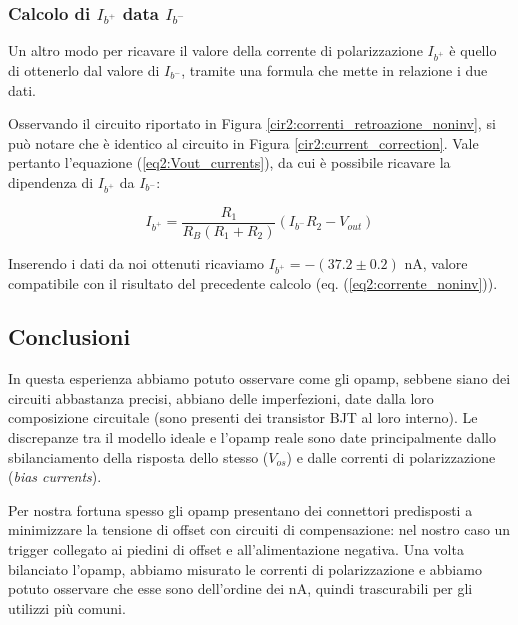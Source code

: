 \subsubsection*{Calcolo di $I_{b^+}$ data $I_{b^-}$}

Un altro modo per ricavare il valore della corrente di polarizzazione $I_{b^+}$ è quello di ottenerlo dal valore di $I_{b^-}$, tramite una formula che mette in relazione i due dati.

Osservando il circuito riportato in Figura \ref{cir2:correnti_retroazione_noninv}, si può notare che è identico al circuito in Figura \ref{cir2:current_correction}.
Vale pertanto l'equazione (\ref{eq2:Vout_currents}), da cui è possibile ricavare la dipendenza di $I_{b^+}$ da $I_{b^-}$:

$$I_{b^+} = \frac{R_1}{R_B(R_1+R_2)}(I_{b^-} R_2-V_{out})$$

Inserendo i dati da noi ottenuti ricaviamo $I_{b^+} = - (37.2 \pm 0.2)$ \si{\nano\ampere}, valore compatibile con il risultato del precedente calcolo (eq. (\ref{eq2:corrente_noninv})).

\subsection*{Conclusioni}
In questa esperienza abbiamo potuto osservare come gli opamp, sebbene siano dei circuiti abbastanza precisi, abbiano delle imperfezioni, date dalla loro composizione circuitale (sono presenti dei transistor BJT al loro interno).
Le discrepanze tra il modello ideale e l'opamp reale sono date principalmente dallo sbilanciamento della risposta dello stesso ($V_{os}$) e dalle correnti di polarizzazione (\textit{bias currents}).

Per nostra fortuna spesso gli opamp presentano dei connettori predisposti a minimizzare la tensione di offset con circuiti di compensazione: nel nostro caso un trigger collegato ai piedini di offset e all'alimentazione negativa.
Una volta bilanciato l'opamp, abbiamo misurato le correnti di polarizzazione e abbiamo potuto osservare che esse sono dell'ordine dei \si{\nano\ampere}, quindi trascurabili per gli utilizzi più comuni.
